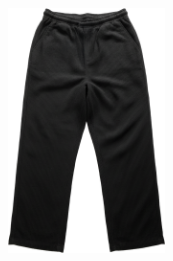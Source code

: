 \documentclass[10pt]{article}
\begin{document}
\begin{minipage}[c][64.75mm][c]{64.75mm}
\end{minipage} \hspace*{6.00mm} \begin{minipage}[c][64.75mm][c]{64.75mm}\centering
\includegraphics[width=64.75mm,height=64.75mm,keepaspectratio]{assets/pants/Generative Fill.png}\
\end{minipage}\
\vspace*{6.00mm}\
\end{document}
